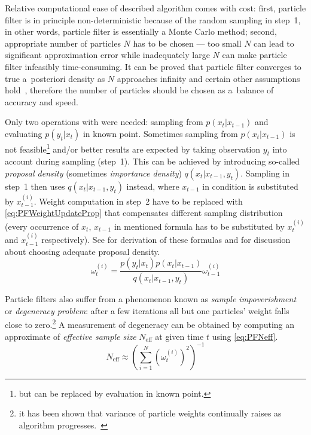 Relative computational ease of described algorithm comes with
cost: first, particle filter is in principle non-deterministic because of the random sampling in
step~1, in other words, particle filter is essentially a Monte Carlo method; second, appropriate
number of particles \(N\) has to be chosen --- too small \(N\) can lead to significant approximation
error while inadequately large \(N\) can make particle filter infeasibly time-consuming. It can be
proved that particle filter converges to true a~posteriori density as \(N\) approaches
infinity and certain other assumptions hold~\cite{CriDou:02}, therefore the number of particles
should be chosen as a~balance of accuracy and speed.

Only two operations with {\pdfs} were needed: sampling from \(p(x_t|x_{t-1})\) and evaluating
\(p(y_t | x_t)\) in known point. Sometimes sampling from \(p(x_t|x_{t-1})\) is not
feasible\footnote{but can be replaced by evaluation in known point.} and/or better results are
expected by taking observation \(y_t\) into account during sampling (step~1). This can be
achieved by introducing so-called \emph{proposal density} (sometimes \emph{importance density})
\(q(x_t|x_{t-1}, y_t)\). Sampling in step~1 then uses \(q(x_t|x_{t-1}, y_t)\) instead, where \(x_{t-1}\) in
condition is substituted by \(x_{t-1}^{(i)}\). Weight computation in step~2 have to be replaced with
\eqref{eq:PFWeightUpdateProp} that compensates different sampling distribution (every occurrence of
\(x_t\), \(x_{t-1}\) in mentioned formula has to be substituted by \(x_t^{(i)}\) and \(x_{t-1}^{(i)}\)
respectively). See \cite{AruMasGor:02} for derivation of these formulas and for discussion about
choosing adequate proposal density.
\begin{equation} \label{eq:PFWeightUpdateProp}
	\omega_t^{(i)} = \frac{p(y_t|x_t)p(x_t|x_{t-1})}{q(x_t|x_{t-1}, y_t)} \omega_{t-1}^{(i)}
\end{equation}

Particle filters also suffer from a phenomenon known as \emph{sample impoverishment} or
\emph{degeneracy problem}: after a few iterations all but one particles' weight falls close to
zero.\footnote{it has been shown that variance of particle weights continually raises as algorithm
progresses.~\cite{AruMasGor:02}} A measurement of degeneracy can be obtained by computing an
approximate of \emph{effective sample size} \(N_{\text{eff}}\) at given time \(t\) using
\eqref{eq:PFNeff}.~\cite{AruMasGor:02}
\begin{equation} \label{eq:PFNeff}
	N_{\text{eff}} \approx \left( \sum_{i=1}^N \left( \omega_t^{(i)} \right)^2 \right)^{-1}
\end{equation}

